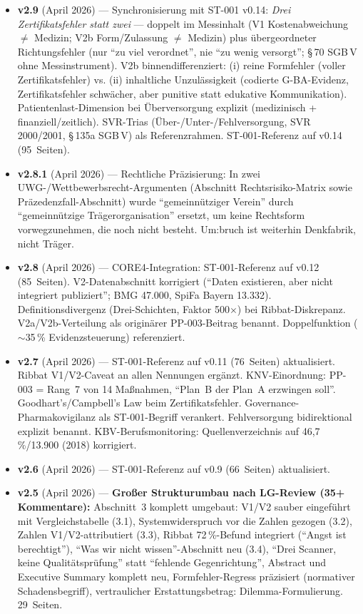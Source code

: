 \documentclass{umbruch-position}
\begin{document}
{\begin{itemize}[leftmargin=3em, itemsep=0.5em]
  \item \textbf{v2.9} (April 2026) --- Synchronisierung mit ST-001 v0.14: \textit{Drei Zertifikatsfehler statt zwei} --- doppelt im Messinhalt (V1 Kostenabweichung $\neq$ Medizin; V2b Form/Zulassung $\neq$ Medizin) plus übergeordneter Richtungsfehler (nur ``zu viel verordnet'', nie ``zu wenig versorgt''; \S\,70 SGB\,V ohne Messinstrument). V2b binnendifferenziert: (i) reine Formfehler (voller Zertifikatsfehler) vs. (ii) inhaltliche Unzulässigkeit (codierte G-BA-Evidenz, Zertifikatsfehler schwächer, aber punitive statt edukative Kommunikation). Patientenlast-Dimension bei Überversorgung explizit (medizinisch + finanziell/zeitlich). SVR-Trias (Über-/Unter-/Fehlversorgung, SVR 2000/2001, \S\,135a SGB\,V) als Referenzrahmen. ST-001-Referenz auf v0.14 (95~Seiten).

  \item \textbf{v2.8.1} (April 2026) --- Rechtliche Präzisierung: In zwei UWG-/Wettbewerbsrecht-Argumenten (Abschnitt Rechtsrisiko-Matrix sowie Präzedenzfall-Abschnitt) wurde ``gemeinnütziger Verein'' durch ``gemeinnützige Trägerorganisation'' ersetzt, um keine Rechtsform vorwegzunehmen, die noch nicht besteht. Um:bruch ist weiterhin Denkfabrik, nicht Träger.
  \item \textbf{v2.8} (April 2026) --- CORE4-Integration: ST-001-Referenz auf v0.12 (85~Seiten). V2-Datenabschnitt korrigiert (``Daten existieren, aber nicht integriert publiziert''; BMG 47.000, SpiFa Bayern 13.332). Definitionsdivergenz (Drei-Schichten, Faktor 500$\times$) bei Ribbat-Diskrepanz. V2a/V2b-Verteilung als originärer PP-003-Beitrag benannt. Doppelfunktion (${\sim}$35\,\% Evidenzsteuerung) referenziert.

  \item \textbf{v2.7} (April 2026) --- ST-001-Referenz auf v0.11 (76~Seiten) aktualisiert. Ribbat V1/V2-Caveat an allen Nennungen ergänzt. KNV-Einordnung: PP-003 = Rang~7 von 14 Maßnahmen, ``Plan~B der Plan~A erzwingen soll''. Goodhart's/Campbell's Law beim Zertifikatsfehler. Governance-Pharmakovigilanz als ST-001-Begriff verankert. Fehlversorgung bidirektional explizit benannt. KBV-Berufsmonitoring: Quellenverzeichnis auf 46,7\,\%/13.900 (2018) korrigiert.

  \item \textbf{v2.6} (April 2026) --- ST-001-Referenz auf v0.9 (66~Seiten) aktualisiert.

  \item \textbf{v2.5} (April 2026) --- \textbf{Großer Strukturumbau nach LG-Review (35+ Kommentare):} Abschnitt~3 komplett umgebaut: V1/V2 sauber eingeführt mit Vergleichstabelle (3.1), Systemwiderspruch vor die Zahlen gezogen (3.2), Zahlen V1/V2-attributiert (3.3), Ribbat 72\,\%-Befund integriert (``Angst ist berechtigt''), ``Was wir nicht wissen''-Abschnitt neu (3.4), ``Drei Scanner, keine Qualitätsprüfung'' statt ``fehlende Gegenrichtung'', Abstract und Executive Summary komplett neu, Formfehler-Regress präzisiert (normativer Schadensbegriff), vertraulicher Erstattungsbetrag: Dilemma-Formulierung. 29~Seiten.


\end{itemize}}
\end{document}
